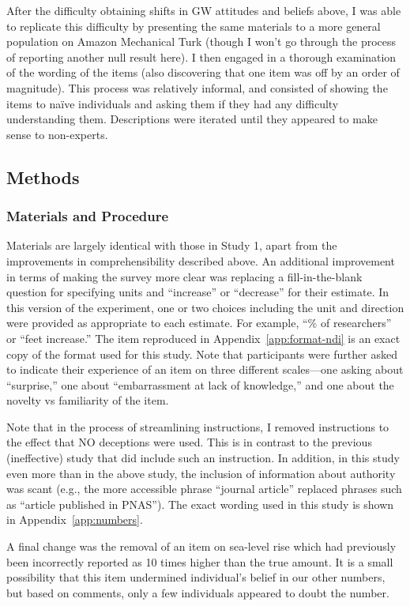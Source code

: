 After the difficulty obtaining shifts in GW attitudes and beliefs above, I was
able to replicate this difficulty by presenting the same materials to a more
general population on Amazon Mechanical Turk (though I won't go through the
process of reporting another null result here). I then engaged in a thorough
examination of the wording of the items (also discovering that one item was off
by an order of magnitude). This process was relatively informal, and consisted
of showing the items to naïve individuals and asking them if they had any
difficulty understanding them. Descriptions were iterated until they appeared to
make sense to non-experts.

\subsection{Methods}

\subsubsection{Materials and Procedure}

Materials are largely identical with those in Study 1, apart from the
improvements in comprehensibility described above. An additional improvement in
terms of making the survey more clear was replacing a fill-in-the-blank question
for specifying units and “increase” or “decrease” for their estimate. In this
version of the experiment, one or two choices including the unit and direction
were provided as appropriate to each estimate. For example, “\% of researchers”
or “feet increase.” The item reproduced in Appendix~\ref{app:format-ndi} is an
exact copy of the format used for this study.  Note that participants were
further asked to indicate their experience of an item on three different
scales---one asking about “surprise,” one about “embarrassment at lack of
knowledge,” and one about the novelty vs familiarity of the item.

Note that in the process of streamlining instructions, I removed instructions to
the effect that NO deceptions were used. This is in contrast to the previous
(ineffective) study that did include such an instruction.  In addition, in this
study even more than in the above study, the inclusion of information about
authority was scant (e.g., the more accessible phrase “journal article” replaced
phrases such as “article published in PNAS”). The exact wording used in this
study is shown in Appendix~\ref{app:numbers}.

A final change was the removal of an item on sea-level rise which had previously
been incorrectly reported as 10 times higher than the true amount. It is a small
possibility that this item undermined individual's belief in our other numbers,
but based on comments, only a few individuals appeared to doubt the number.

